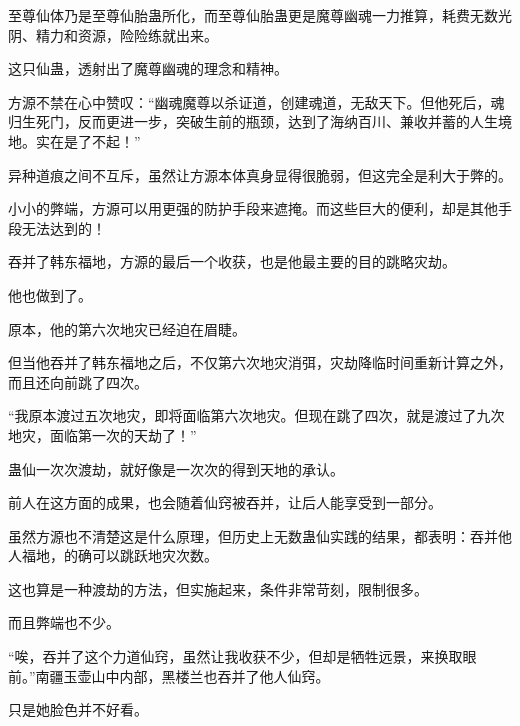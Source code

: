 \begin{this_body}
至尊仙体乃是至尊仙胎蛊所化，而至尊仙胎蛊更是魔尊幽魂一力推算，耗费无数光阴、精力和资源，险险练就出来。

这只仙蛊，透射出了魔尊幽魂的理念和精神。

方源不禁在心中赞叹：“幽魂魔尊以杀证道，创建魂道，无敌天下。但他死后，魂归生死门，反而更进一步，突破生前的瓶颈，达到了海纳百川、兼收并蓄的人生境地。实在是了不起！”

异种道痕之间不互斥，虽然让方源本体真身显得很脆弱，但这完全是利大于弊的。

小小的弊端，方源可以用更强的防护手段来遮掩。而这些巨大的便利，却是其他手段无法达到的！

吞并了韩东福地，方源的最后一个收获，也是他最主要的目的跳略灾劫。

他也做到了。

原本，他的第六次地灾已经迫在眉睫。

但当他吞并了韩东福地之后，不仅第六次地灾消弭，灾劫降临时间重新计算之外，而且还向前跳了四次。

“我原本渡过五次地灾，即将面临第六次地灾。但现在跳了四次，就是渡过了九次地灾，面临第一次的天劫了！”

蛊仙一次次渡劫，就好像是一次次的得到天地的承认。

前人在这方面的成果，也会随着仙窍被吞并，让后人能享受到一部分。

虽然方源也不清楚这是什么原理，但历史上无数蛊仙实践的结果，都表明：吞并他人福地，的确可以跳跃地灾次数。

这也算是一种渡劫的方法，但实施起来，条件非常苛刻，限制很多。

而且弊端也不少。

“唉，吞并了这个力道仙窍，虽然让我收获不少，但却是牺牲远景，来换取眼前。”南疆玉壶山中内部，黑楼兰也吞并了他人仙窍。

只是她脸色并不好看。

\end{this_body}

